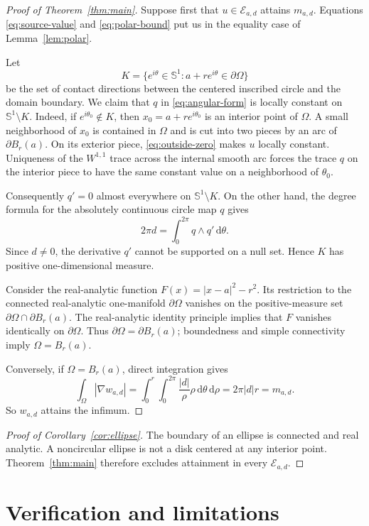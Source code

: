 \documentclass[11pt]{article}
\newcommand{\Sone}{\mathbb S^1}
\newcommand{\Ead}{\mathcal E_{a,d}}
\newcommand{\dd}{\,\mathrm d}
\begin{document}
\begin{proof}[Proof of Theorem~\ref{thm:main}]
Suppose first that $u\in\Ead$ attains $m_{a,d}$. Equations
\eqref{eq:source-value} and \eqref{eq:polar-bound} put us in the equality
case of Lemma~\ref{lem:polar}.

Let
\[
 K=\{e^{i\theta}\in\Sone:a+r e^{i\theta}\in\partial\Omega\}
\]
be the set of contact directions between the centered inscribed circle and
the domain boundary. We claim that $q$ in \eqref{eq:angular-form} is locally
constant on $\Sone\setminus K$. Indeed, if $e^{i\theta_0}\notin K$, then
$x_0=a+r e^{i\theta_0}$ is an interior point of $\Omega$. A small
neighborhood of $x_0$ is contained in $\Omega$ and is cut into two pieces by
an arc of $\partial B_r(a)$. On its exterior piece, \eqref{eq:outside-zero}
makes $u$ locally constant. Uniqueness of the $W^{1,1}$ trace across the
internal smooth arc forces the trace $q$ on the interior piece to have the
same constant value on a neighborhood of $\theta_0$.

Consequently $q'=0$ almost everywhere on $\Sone\setminus K$. On the other
hand, the degree formula for the absolutely continuous circle map $q$ gives
\[
 2\pi d=\int_0^{2\pi} q\wedge q'\dd\theta.
\]
Since $d\ne0$, the derivative $q'$ cannot be supported on a null set. Hence
$K$ has positive one-dimensional measure.

Consider the real-analytic function
$F(x)=|x-a|^2-r^2$. Its restriction to the connected real-analytic
one-manifold $\partial\Omega$ vanishes on the positive-measure set
$\partial\Omega\cap\partial B_r(a)$. The real-analytic identity principle
\cite{KrantzParks} implies that $F$ vanishes identically on
$\partial\Omega$. Thus $\partial\Omega=\partial B_r(a)$; boundedness and
simple connectivity imply $\Omega=B_r(a)$.

Conversely, if $\Omega=B_r(a)$, direct integration gives
\[
 \int_\Omega|\nabla w_{a,d}|
 =\int_0^r\!\int_0^{2\pi}\frac{|d|}{\rho}\rho
 \dd\theta\dd\rho=2\pi|d|r=m_{a,d}.
\]
So $w_{a,d}$ attains the infimum.
\end{proof}

\begin{proof}[Proof of Corollary~\ref{cor:ellipse}]
The boundary of an ellipse is connected and real analytic. A noncircular
ellipse is not a disk centered at any interior point. Theorem~\ref{thm:main}
therefore excludes attainment in every $\Ead$.
\end{proof}

\section{Verification and limitations}
\end{document}

